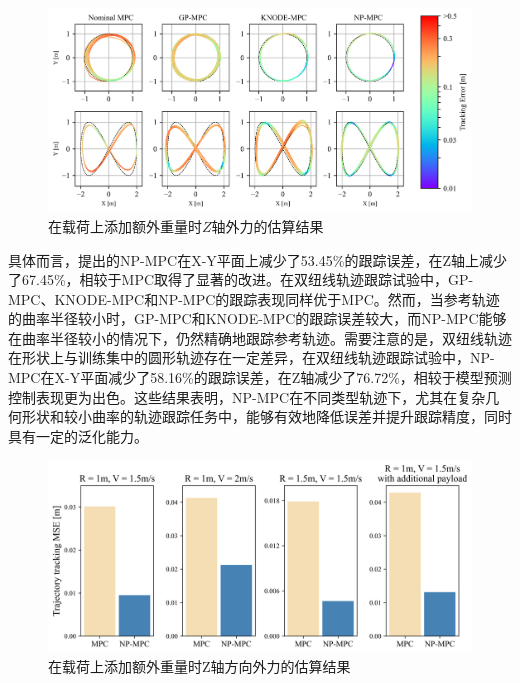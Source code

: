 \documentclass[lang=chs, degree=master, blindreview=true, winfonts=true]{yanputhesis}
\begin{document}
\begin{figure}[hbt!]
	\centering
	\includegraphics[width=38pc]{picture/kk/color.png} 
	\caption{在载荷上添加额外重量时$Z$轴外力的估算结果} 
	\label{color}
\end{figure}
具体而言，提出的NP-MPC在X-Y平面上减少了53.45\%的跟踪误差，在Z轴上减少了67.45\%，相较于MPC取得了显著的改进。在双纽线轨迹跟踪试验中，GP-MPC、KNODE-MPC和NP-MPC的跟踪表现同样优于MPC。然而，当参考轨迹的曲率半径较小时，GP-MPC和KNODE-MPC的跟踪误差较大，而NP-MPC能够在曲率半径较小的情况下，仍然精确地跟踪参考轨迹。需要注意的是，双纽线轨迹在形状上与训练集中的圆形轨迹存在一定差异，在双纽线轨迹跟踪试验中，NP-MPC在X-Y平面减少了58.16\%的跟踪误差，在Z轴减少了76.72\%，相较于模型预测控制表现更为出色。这些结果表明，NP-MPC在不同类型轨迹下，尤其在复杂几何形状和较小曲率的轨迹跟踪任务中，能够有效地降低误差并提升跟踪精度，同时具有一定的泛化能力。

\begin{figure}[hbt!]
	\centering
	\includegraphics[width=34pc]{picture/kk/prediction_res.png} 
	\caption{在载荷上添加额外重量时Z轴方向外力的估算结果} 
	\label{prediction_res}
\end{figure}
\end{document}
